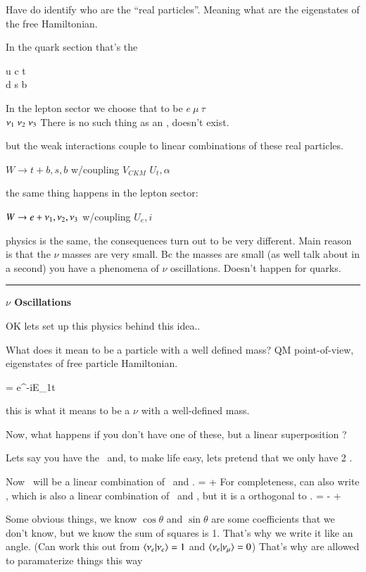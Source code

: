 {Have do identify who are the ``real particles''. 
Meaning what are the eigenstates of the free Hamiltonian.

In the quark section that's the 
\begin{center}
u c t \\
d s b
\end{center}
In the lepton sector we choose that to be 
\bc
$e\ \mu\ \tau$ \\
$\nu_1\ \nu_2\ \nu_3 $
\ec
There is no such thing as an \nue, doesn't exist. 

but the weak interactions couple to linear combinations of these real particles.  

$W \rightarrow t + b,s,b$ w/coupling $V_{CKM}$  $U_t,\alpha$

the same thing happens in the lepton sector:


$W \rightarrow e + \nu_1,\nu_2,\nu_3$ w/coupling $U_e,i$

physics is the same,  the consequences turn out to be very different.  
Main reason is that the $\nu$ masses  are very small. 
Bc the masses are small (as well talk about in a second) you have a phenomena of $\nu$ oscillations.
Doesn't happen for quarks. 

\noindent\rule{\textwidth}{1pt}

\textbf{$\nu$ Oscillations}

OK lets set up this physics behind this idea.. 

What does it mean to be a particle with a well defined mass?
QM point-of-view, eigenstates of free particle Hamiltonian. 

\be
\ket{\nuone} =  e^{-iE_1t} \ket{\nuone}
\ee

this is what it means to be a $\nu$ with a well-defined mass.

Now, what happens if you don't have one of these, but a linear superposition  ?

Lets say you have the \nue\ and, to make life easy, lets pretend that we only have 2 \nus. 

Now \nue\ will be a linear combination of \nuone\ and \nutwo. 
\be
\ket{\nue} = \cos\theta \ket{\nuone} + \sin\theta \ket{\nutwo}
\ee
For completeness, can also write \numu, which is also a linear combination of \nuone\ and \nutwo, but it is a orthogonal to \nue.
\be
\ket{\numu} = -\sin\theta \ket{\nuone} + \cos\theta \ket{\nutwo}
\ee


Some obvious things, we know $\cos\theta$ and $\sin\theta$ are some coefficients that we don't know, but we know the sum of squares is 1. 
That's why we write it like an angle.
(Can work this out from  $\braket{\nu_e | \nu_e}  = 1$ and $\braket{\nu_e | \nu_\mu}  = 0$)
That's why are allowed to paramaterize things this way

}
